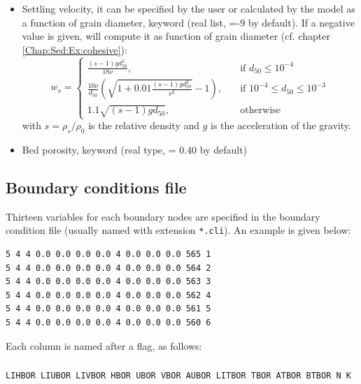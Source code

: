 \begin{itemize}
\item Settling velocity, it can be specified by the user or calculated by the model as a function of grain diameter, keyword  (real list, =-9 by default). If a negative value is given, \gaia{} will compute it as function of grain diameter (cf. chapter \ref{Chap:Sed:Ex:cohesive}):
  \begin{equation*}
w_{s} = \left\{\begin{array}{ll}
\displaystyle
\frac{(s-1)g d_{50}^2}{18\nu}, & \quad \text{if } d_{50} \leq 10^{-4} \\
\displaystyle
\frac{10\nu}{d_{50}} \left(\sqrt{1+0.01\frac{(s-1)gd_{50}^3}{\nu^2}}-1\right), & \quad \text{if } 10^{-4} \leq d_{50} \leq 10^{-3}\\
\displaystyle
1.1 \sqrt{(s-1)gd_{50}}, & \quad \text{otherwise}
\end{array}
\right.
\end{equation*}
with $s=\rho_{s}/\rho_0$ is the relative density and $g$ is the acceleration of the gravity.%
\item Bed porosity, keyword  (real type, {\ttfamily = 0.40} by default)
\end{itemize}



\subsection{Boundary conditions file}\label{sec:flags}
Thirteen variables for each boundary nodes are specified in the boundary condition file (usually named with extension \texttt{*.cli}). An example is given below:

\begin{lstlisting}[frame=trBL]
5 4 4 0.0 0.0 0.0 0.0 4 0.0 0.0 0.0 565 1
5 4 4 0.0 0.0 0.0 0.0 4 0.0 0.0 0.0 564 2
5 4 4 0.0 0.0 0.0 0.0 4 0.0 0.0 0.0 563 3
5 4 4 0.0 0.0 0.0 0.0 4 0.0 0.0 0.0 562 4
5 4 4 0.0 0.0 0.0 0.0 4 0.0 0.0 0.0 561 5
5 4 4 0.0 0.0 0.0 0.0 4 0.0 0.0 0.0 560 6
\end{lstlisting}

Each column is named after a flag, as follows:
\subsubsection{}
\begin{lstlisting}[frame=trBL]
LIHBOR LIUBOR LIVBOR HBOR UBOR VBOR AUBOR LITBOR TBOR ATBOR BTBOR N K
\end{lstlisting}
